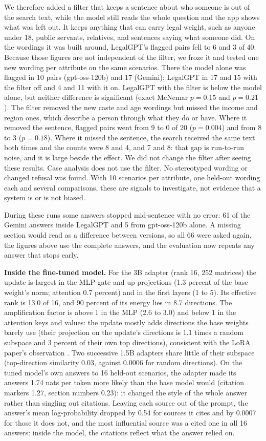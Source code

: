 \documentclass[conference]{IEEEtran}
\begin{document}
We therefore added a filter that keeps a sentence about who someone is out of the search text, while the
model still reads the whole question and the app shows what was left out. It keeps anything that can carry
legal weight, such as anyone under 18, public servants, relatives, and sentences saying what someone did.
On the wordings it was built around, LegalGPT's flagged pairs fell to 6 and 3 of 40. Because those figures
are not independent of the filter, we froze it and tested one new wording per attribute on the same
scenarios. There the model alone was flagged in 10 pairs (gpt-oss-120b) and 17 (Gemini); LegalGPT in 17 and
15 with the filter off and 4 and 11 with it on. LegalGPT with the filter is below the model alone, but
neither difference is significant (exact McNemar $p=0.15$ and $p=0.21$). The filter removed the new caste
and age wordings but missed the income and region ones, which describe a person through what they do or
have. Where it removed the sentence, flagged pairs went from 9 to 0 of 20 ($p=0.004$) and from 8 to 3
($p=0.18$). Where it missed the sentence, the search received the same text both times and the counts were
8 and 4, and 7 and 8: that gap is run-to-run noise, and it is large beside the effect. We did not change the
filter after seeing these results. Case analysis does not use the filter. No stereotyped wording or changed
refusal was found. With 10 scenarios per attribute, one held-out wording each and several comparisons, these
are signals to investigate, not evidence that a system is or is not biased.

During these runs some answers stopped mid-sentence with no error: 61 of the Gemini answers inside
LegalGPT and 5 from gpt-oss-120b alone. A missing section would read as a difference between versions, so
all 66 were asked again, the figures above use the complete answers, and the evaluation now repeats any
answer that stops early.

\textbf{Inside the fine-tuned model.} For the 3B adapter (rank 16, 252 matrices) the update is largest
in the MLP gate and up projections (1.3 percent of the base weight's norm; attention 0.7 percent) and in
the first layers (1 to 5). Its effective rank is 13.0 of 16, and 90 percent of its energy lies in 8.7
directions. The amplification factor is above 1 in the MLP (2.6 to 3.0) and below 1 in the attention
keys and values: the update mostly adds directions the base weights barely use (their projection on
the update's directions is 1.1 times a random subspace and 3 percent of their own top directions),
consistent with the LoRA paper's observation \cite{hu2022lora}. Two successive 1.5B adapters share
little of their subspace (top-direction similarity 0.03, against 0.0006 for random directions). On the
tuned model's own answers to 16 held-out scenarios, the adapter made its answers 1.74 nats per token
more likely than the base model would (citation markers 1.27, section numbers 0.23): it changed the
style of the whole answer rather than singling out citations. Leaving each source out of the prompt, the answer's mean
log-probability dropped by 0.54 for sources it cites and by 0.0007 for those it does not, and the most
influential source was a cited one in all 16 answers: inside the model, the citations reflect what
the answer relied on.
\end{document}
